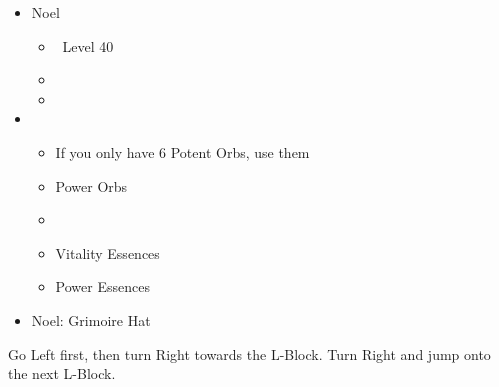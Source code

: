 \begin{menu}
	\begin{itemize}
		\crystarium
		\begin{itemize}
			\item Noel
			      \begin{itemize}
				      \item \sen\ Level 40
				      \item {}
				      \item {}
			      \end{itemize}
			\item \chu
			      \begin{itemize}
				      \item If you only have 6 Potent Orbs, use them
				      \item Power Orbs
				      \item {}
				      \item Vitality Essences
				      \item Power Essences
			      \end{itemize}
		\end{itemize}
		\equip
		\begin{itemize}
			\item Noel: Grimoire Hat
		\end{itemize}
	\end{itemize}
\end{menu}

Go Left first, then turn Right towards the L-Block. Turn Right and jump onto the next L-Block.

